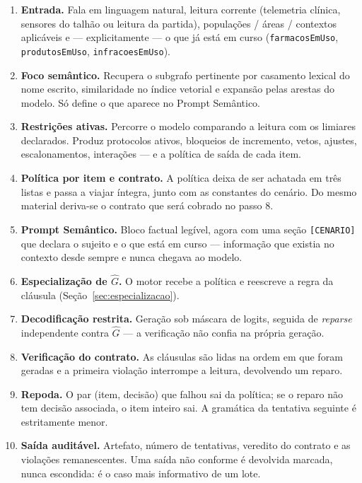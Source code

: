 \documentclass[11pt,a4paper]{article}
\begin{document}
\begin{enumerate}[leftmargin=*,itemsep=2pt]
\item \textbf{Entrada.} Fala em linguagem natural, leitura corrente
(telemetria clínica, sensores do talhão ou leitura da partida), populações /
áreas / contextos aplicáveis e --- explicitamente --- o que já está em curso
(\texttt{farmacosEmUso}, \texttt{produtosEmUso}, \texttt{infracoesEmUso}).

\item \textbf{Foco semântico.} Recupera o subgrafo pertinente por casamento
lexical do nome escrito, similaridade no índice vetorial e expansão pelas
arestas do modelo. Só define o que aparece no Prompt Semântico.

\item \textbf{Restrições ativas.} Percorre o modelo comparando a leitura com os
limiares declarados. Produz protocolos ativos, bloqueios de incremento, vetos,
ajustes, escalonamentos, interações --- e a política de saída de cada item.

\item \textbf{Política por item e contrato.} A política deixa de ser achatada em
três listas e passa a viajar íntegra, junto com as constantes do cenário. Do
mesmo material deriva-se o contrato que será cobrado no passo 8.

\item \textbf{Prompt Semântico.} Bloco factual legível, agora com uma seção
\texttt{[CENARIO]} que declara o sujeito e o que está em curso --- informação
que existia no contexto desde sempre e nunca chegava ao modelo.

\item \textbf{Especialização de $\hat{G}$.} O motor recebe a política e reescreve
a regra da cláusula (Seção~\ref{sec:especializacao}).

\item \textbf{Decodificação restrita.} Geração sob máscara de logits, seguida de
\emph{reparse} independente contra $\hat{G}$ --- a verificação não confia na
própria geração.

\item \textbf{Verificação do contrato.} As cláusulas são lidas na ordem em que
foram geradas e a primeira violação interrompe a leitura, devolvendo um reparo.

\item \textbf{Repoda.} O par (item, decisão) que falhou sai da política; se o
reparo não tem decisão associada, o item inteiro sai. A gramática da tentativa
seguinte é estritamente menor.

\item \textbf{Saída auditável.} Artefato, número de tentativas, veredito do
contrato e as violações remanescentes. Uma saída não conforme é devolvida
marcada, nunca escondida: é o caso mais informativo de um lote.
\end{enumerate}
\end{document}
